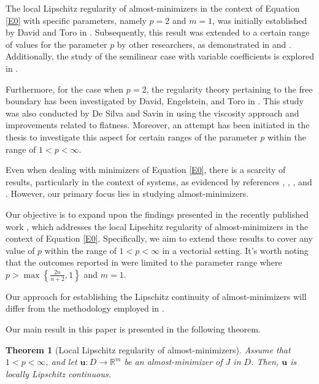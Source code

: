 \documentclass{amsart}
\newtheorem{theorem}{Theorem}[section]
\begin{document}
The local Lipschitz regularity of almost-minimizers in the context of Equation \eqref{E0} with specific parameters, namely $p=2$ and $m=1$, was initially established by David and Toro in \cite{MR3385167}. Subsequently, this result was extended to a certain range of values for the parameter $p$ by other researchers, as demonstrated in \cite{dipierro2022lipschitz} and \cite{forcillo2021regularity}. Additionally, the study of the semilinear case with variable coefficients is explored in \cite{MR3827045}.

Furthermore, for the case when $p=2$, the regularity theory pertaining to the free boundary has been investigated by David, Engelstein, and Toro in \cite{MR3948692}. This study was also conducted by De Silva and Savin in \cite{MR4126326} using the viscosity approach and improvements related to flatness. Moreover, an attempt has been initiated in the thesis \cite{forcillo2021regularity} to investigate this aspect for certain ranges of the parameter $p$ within the range of $1<p<\infty$.

Even when dealing with minimizers of Equation \eqref{E0}, there is a scarcity of results, particularly in the context of systems, as evidenced by references \cite{MR3827812}, \cite{MR4142361}, \cite{fotouhi-shahgholian2023}, and \cite{MR4085121}. However, our primary focus lies in studying almost-minimizers.

Our objective is to expand upon the findings presented in the recently published work \cite{dipierro2022lipschitz}, which addresses the local Lipschitz regularity of almost-minimizers in the context of Equation \eqref{E0}. Specifically, we aim to extend these results to cover any value of $p$ within the range of $1<p<\infty$ in a vectorial setting. It's worth noting that the outcomes reported in \cite{dipierro2022lipschitz} were limited to the parameter range where $p>\max \left\{\frac{2n}{n+2}, 1 \right\}$ and $m=1$.

Our approach for establishing the Lipschitz continuity of almost-minimizers will differ from the methodology employed in \cite{dipierro2022lipschitz}.

Our main result in this paper is presented in the following theorem.

\begin{theorem}[Local Lipschitz regularity of almost-minimizers]
\label{T1}
Assume that $ 1<p<\infty$, and let $\mathbf{u} :D \to \mathbb{R}^m $ be an almost-minimizer of $J$ in $D$. Then, $\mathbf{u}$ is locally Lipschitz continuous.
\end{theorem}
\end{document}
